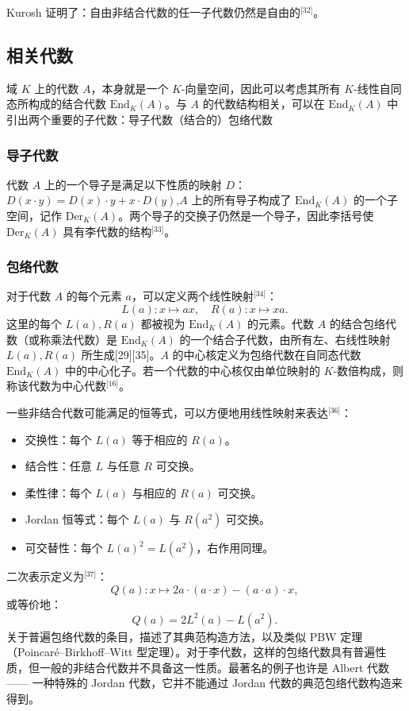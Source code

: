 Kurosh 证明了：自由非结合代数的任一子代数仍然是自由的\(^\text{[32]}\)。
\subsection{相关代数}
域 $K$ 上的代数 $A$，本身就是一个 $K$-向量空间，因此可以考虑其所有 $K$-线性自同态所构成的结合代数 $\mathrm{End}_K(A)$。与 $A$ 的代数结构相关，可以在 $\mathrm{End}_K(A)$ 中引出两个重要的子代数：导子代数（结合的）包络代数
\subsubsection{导子代数}
代数 $A$ 上的一个导子是满足以下性质的映射 $D$：$D(x \cdot y) = D(x) \cdot y + x \cdot D(y)$,$A$ 上的所有导子构成了 $\mathrm{End}_K(A)$ 的一个子空间，记作 $\mathrm{Der}_K(A)$。两个导子的交换子仍然是一个导子，因此李括号使 $\mathrm{Der}_K(A)$ 具有李代数的结构\(^\text{[33]}\)。
\subsubsection{包络代数}
对于代数 $A$ 的每个元素 $a$，可以定义两个线性映射\(^\text{[34]}\)：
$$
L(a): x \mapsto ax ,\quad R(a): x \mapsto xa.~
$$
这里的每个 $L(a), R(a)$ 都被视为 $\mathrm{End}_K(A)$ 的元素。代数 $A$ 的结合包络代数（或称乘法代数）是 $\mathrm{End}_K(A)$ 的一个结合子代数，由所有左、右线性映射 $L(a), R(a)$ 所生成[29][35]。$A$ 的中心核定义为包络代数在自同态代数 $\mathrm{End}_K(A)$ 中的中心化子。若一个代数的中心核仅由单位映射的 $K$-数倍构成，则称该代数为中心代数\(^\text{[16]}\)。

一些非结合代数可能满足的恒等式，可以方便地用线性映射来表达\(^\text{[36]}\)：
\begin{itemize}
\item 交换性：每个 $L(a)$ 等于相应的 $R(a)$。
\item 结合性：任意 $L$ 与任意 $R$ 可交换。
\item 柔性律：每个 $L(a)$ 与相应的 $R(a)$ 可交换。
\item Jordan 恒等式：每个 $L(a)$ 与 $R(a^2)$ 可交换。
\item 可交替性：每个 $L(a)^2 = L(a^2)$，右作用同理。
\end{itemize}
二次表示定义为\(^\text{[37]}\)：
$$
Q(a): x \mapsto 2a \cdot (a \cdot x) - (a \cdot a)\cdot x,~
$$
或等价地：
$$
Q(a) = 2L^2(a) - L(a^2).~
$$
关于普遍包络代数的条目，描述了其典范构造方法，以及类似 PBW 定理（Poincaré–Birkhoff–Witt 型定理）。对于李代数，这样的包络代数具有普遍性质，但一般的非结合代数并不具备这一性质。最著名的例子也许是 Albert 代数 —— 一种特殊的 Jordan 代数，它并不能通过 Jordan 代数的典范包络代数构造来得到。
